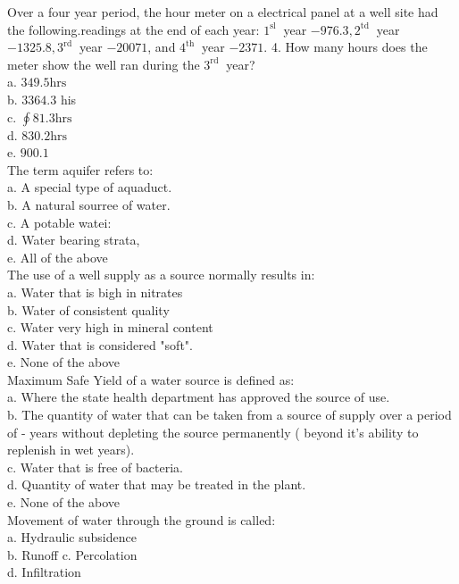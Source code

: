 Over a four year period, the hour meter on a electrical panel at a well site had the following.readings at the end of each year: $1^{\text {sl }}$ year $-976.3,2^{\text {td }}$ year $-1325.8,3^{\text {rd }}$ year $-20071$, and $4^{\text {th }}$ year $-2371$. 4. How many hours does the meter show the well ran during the $3^{\text {rd }}$ year?\\
a. $349.5 \mathrm{hrs}$\\
b. $3364.3$ his\\
c. $\oint 81.3 \mathrm{hrs}$\\
d. $830.2 \mathrm{hrs}$\\
e. $900.1$\\

The term aquifer refers to:\\
a. A special type of aquaduct.\\
b. A natural sourree of water.\\
c. A potable watei:\\
d. Water bearing strata,\\
e. All of the above\\

The use of a well supply as a source normally results in:\\
a. Water that is bigh in nitrates\\
b. Water of consistent quality\\
c. Water very high in mineral content\\
d. Water that is considered "soft".\\
e. None of the above\\

Maximum Safe Yield of a water source is defined as:\\
a. Where the state health department has approved the source of use.\\
b. The quantity of water that can be taken from a source of supply over a period of - years without depleting the source permanently ( beyond it's ability to replenish in wet years).\\
c. Water that is free of bacteria.\\
d. Quantity of water that may be treated in the plant.\\
e. None of the above\\

Movement of water through the ground is called:\\
a. Hydraulic subsidence\\
b. Runoff c. Percolation\\
d. Infiltration\\

